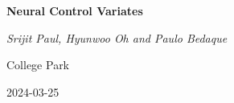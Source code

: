 \thispagestyle{empty}

\begin{center}
	\vfill
    \vspace*{0.4\textheight}

	\Huge
	\bf{Neural Control Variates}
    
	\Large
	\it{Srijit Paul, Hyunwoo Oh and Paulo Bedaque}

        \vspace*{0.4\textheight}
        \large
        {College Park}
        
        \large
        {2024-03-25}
	
    \normalsize
    
\end{center}